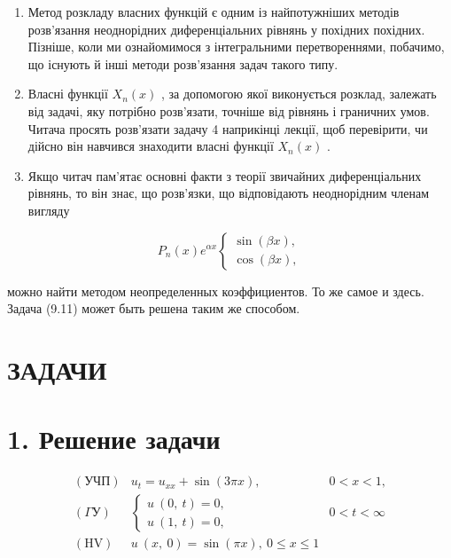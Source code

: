 \documentclass[
  ukrainian,
]{article}
\begin{document}
\begin{enumerate}
\def\labelenumi{\arabic{enumi}.}
\item
  Метод розкладу власних функцій є одним із найпотужніших методів
  розв'язання неоднорідних диференціальних рівнянь у похідних похідних.
  Пізніше, коли ми ознайомимося з інтегральними перетвореннями,
  побачимо, що існують й інші методи розв'язання задач такого типу.
\item
  Власні функції \(X_n(x)\) , за допомогою якої виконується розклад,
  залежать від задачі, яку потрібно розв'язати, точніше від рівнянь і
  граничних умов. Читача просять розв'язати задачу 4 наприкінці лекції,
  щоб перевірити, чи дійсно він навчився знаходити власні функції
  \(X_n(x)\) .
\item
  Якщо читач пам'ятає основні факти з теорії звичайних диференціальних
  рівнянь, то він знає, що розв'язки, що відповідають неоднорідним
  членам вигляду
\end{enumerate}

\[
P_n(x) e^{\alpha x}
\begin{cases} \sin{(\beta x)}, \\ \cos{(\beta x)}, \end{cases}
\]

можно найти методом неопределенных коэффициентов. То же самое и здесь.
Задача (9.11) может быть решена таким же способом.

\section{ЗАДАЧИ}\label{ux437ux430ux434ux430ux447ux438}

\section{1. Решение
задачи}\label{ux440ux435ux448ux435ux43dux438ux435-ux437ux430ux434ux430ux447ux438}

\[
\begin{array}{ll} (\text{УЧП}) & u_t = u_{xx} + \sin{(3\pi x)}, & 0 < x < 1, \\ (\Gamma \text{У}) & \begin{cases} u \ (0, \ t) = 0, \\ u \ (1, \ t) = 0, \end{cases} & 0 < t < \infty \\ (\text{HV}) & u \ (x, \ 0) = \sin{(\pi x)}, \ 0 \leqslant x \leqslant 1 \end{array}
\]
\end{document}
